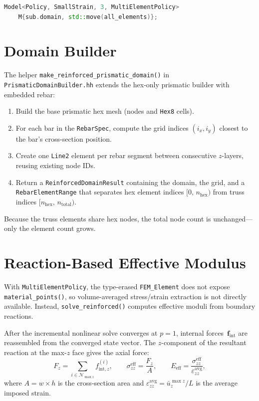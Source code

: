 \begin{lstlisting}[language=C++, basicstyle=\ttfamily\small]
Model<Policy, SmallStrain, 3, MultiElementPolicy>
    M{sub.domain, std::move(all_elements)};
\end{lstlisting}


\section{Domain Builder}
\label{sec:reinf-domain-builder}

The helper \texttt{make\_reinforced\_prismatic\_domain()} in
\texttt{PrismaticDomainBuilder.hh} extends the hex-only prismatic builder
with embedded rebar:

\begin{enumerate}
  \item Build the base prismatic hex mesh (nodes and \texttt{Hex8} cells).
  \item For each bar in the \texttt{RebarSpec}, compute the grid indices
        $(i_x, i_y)$ closest to the bar's cross-section position.
  \item Create one \texttt{Line2} element per rebar segment between
        consecutive $z$-layers, reusing existing node IDs.
  \item Return a \texttt{ReinforcedDomainResult} containing the domain,
        the grid, and a \texttt{RebarElementRange} that separates
        hex element indices $[0,\,n_{\mathrm{hex}})$ from truss indices
        $[n_{\mathrm{hex}},\,n_{\mathrm{total}})$.
\end{enumerate}

Because the truss elements share hex nodes, the total node count is
unchanged---only the element count grows.


\section{Reaction-Based Effective Modulus}
\label{sec:reinf-reaction-emod}

With \texttt{MultiElementPolicy}, the type-erased
\texttt{FEM\_Element} does not expose \texttt{material\_points()}, so
volume-averaged stress/strain extraction is not directly available.
Instead, \texttt{solve\_reinforced()} computes effective moduli from
boundary reactions.

After the incremental nonlinear solve converges at $p = 1$, internal
forces~$\mathbf{f}_\text{int}$ are reassembled from the converged state
vector.  The $z$-component of the resultant reaction at the max-$z$
face gives the axial force:
\begin{equation}
  F_z = \sum_{i \in \mathcal{N}_{\max z}} f_{\text{int},z}^{(i)},
  \qquad
  \sigma_{zz}^{\text{eff}} = \frac{F_z}{A},
  \qquad
  E_{\text{eff}} = \frac{\sigma_{zz}^{\text{eff}}}
                        {\varepsilon_{zz}^{\text{avg}}},
  \label{eq:reinf-eeff}
\end{equation}
where $A = w\!\times\!h$ is the cross-section area and
$\varepsilon_{zz}^{\text{avg}} = \bar{u}_z^{\max z} / L$ is the
average imposed strain.


